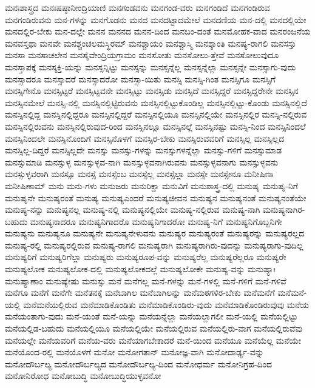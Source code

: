 {ಮನಃಶಾಸ್ತ್ರದ
ಮನಃಷಷ್ಠಾನೀಂದ್ರಿಯಾಣಿ
ಮನಗಂಡವನು
ಮನಗಂಡ-ವರು
ಮನಗಂಡಿದೆ
ಮನಗಂಡಿರುವ
ಮನಗಂಡಿರುವನು
ಮನ-ಗಳನ್ನು
ಮನಗೊಡನು
ಮನದ
ಮನದಟ್ಟಾದಮೇಲೆ
ಮನದಣಿಯ
ಮನ-ದಲ್ಲಿ
ಮನದಲ್ಲಿಯೇ
ಮನದಲ್ಲಿರ-ಬೇಕು
ಮನ-ದಲ್ಲೇ
ಮನನ
ಮನನದ
ಮನನ-ದಿಂದ
ಮನಬಂ-ದಂತೆ
ಮನಮೋಹಕ-ವಾದ
ಮನರಂಜನೆಯ
ಮನವಸ್ತಥಾ
ಮನವೇ
ಮನಶ್ಚಂಚಲಮಸ್ಥಿರಮ್
ಮನಶ್ಚಾಯಂ
ಮನಶ್ಚಾಸ್ಮಿ
ಮನಶ್ಶಾಂತಿ
ಮನಷ್ಯ-ರಾಗಲಿ
ಮನಸಸ್ತು
ಮನಸಾ
ಮನಸಾಚಲೇನ
ಮನಸೈವೇಂದ್ರಿಯಗ್ರಾಮಂ
ಮನಸೋತು
ಮನಸೋಲು-ತ್ತೇವೆ
ಮನಸೋಲುವುದೂ
ಮನಸ್ತಾಪಕ್ಕೆ
ಮನಸ್ಶಕ್ತಿ-ಯನ್ನು
ಮನಸ್ಸನ್ನಿಟ್ಟು
ಮನಸ್ಸನ್ನು
ಮನಸ್ಸನ್ನೆಲ್ಲ
ಮನಸ್ಸನ್ನೆಲ್ಲಾ
ಮನಸ್ಸನ್ನೇ
ಮನಸ್ಸಾಗು-ವುದು
ಮನಸ್ಸಾದರೂ
ಮನಸ್ಸಾದರೆ
ಮನಸ್ಸಾದರೋ
ಮನಸ್ಸಾ-ಯಿತು
ಮನಸ್ಸಿ
ಮನಸ್ಸಿ-ಗಿಂತ
ಮನಸ್ಸಿಗೂ
ಮನಸ್ಸಿಗೆ
ಮನಸ್ಸಿಗೇನೊ
ಮನಸ್ಸಿಟ್ಟರೆ
ಮನಸ್ಸಿಟ್ಟವನೇ
ಮನಸ್ಸಿಟ್ಟು
ಮನಸ್ಸಿಡು
ಮನಸ್ಸಿದೆ
ಮನಸ್ಸಿದ್ದರೆ
ಮನಸ್ಸಿದ್ದರೇನೇ
ಮನಸ್ಸಿನ
ಮನಸ್ಸಿನಮೇಲೆ
ಮನಸ್ಸಿ-ನಲ್ಲಿ
ಮನಸ್ಸಿನಲ್ಲಿಟ್ಟಿರುವನು
ಮನಸ್ಸಿನಲ್ಲಿಟ್ಟುಕೊಂಡಿಲ್ಲ
ಮನಸ್ಸಿನಲ್ಲಿಟ್ಟು-ಕೊಂಡು
ಮನಸ್ಸಿನಲ್ಲಿದೆ
ಮನಸ್ಸಿನಲ್ಲಿದ್ದ
ಮನಸ್ಸಿನಲ್ಲಿದ್ದರೂ
ಮನಸ್ಸಿನಲ್ಲಿದ್ದರೆ
ಮನಸ್ಸಿನಲ್ಲಿಯೂ
ಮನಸ್ಸಿನಲ್ಲಿಯೇ
ಮನಸ್ಸಿನಲ್ಲಿರ
ಮನಸ್ಸಿ-ನಲ್ಲಿರುವ
ಮನಸ್ಸಿನಲ್ಲಿರುವನು
ಮನಸ್ಸಿನಲ್ಲಿರುವುದ-ರಿಂದ
ಮನಸ್ಸಿನಲ್ಲೂ
ಮನಸ್ಸಿನಲ್ಲೆ
ಮನಸ್ಸಿನಷ್ಟು
ಮನಸ್ಸಿ-ನಿಂದ
ಮನಸ್ಸಿನಿಂದಲೆ
ಮನಸ್ಸಿನಿಂದಲೇ
ಮನಸ್ಸಿನೊಂದಿಗೆ
ಮನಸ್ಸಿನೊಳಗೆ
ಮನಸ್ಸಿರ-ಬೇಕು
ಮನಸ್ಸಿರುವವರಿಗೆ
ಮನಸ್ಸಿಲ್ಲ
ಮನಸ್ಸಿಲ್ಲದ
ಮನಸ್ಸಿಲ್ಲ-ದಿದ್ದರೆ
ಮನಸ್ಸಿಲ್ಲದೇ
ಮನಸ್ಸು
ಮನಸ್ಸು-ಗಳನ್ನು
ಮನಸ್ಸುಗಳನ್ನೆಲ್ಲಾ
ಮನಸ್ಸು-ಗಳಿಗೆ
ಮನಸ್ಸುಮಾಡ
ಮನಸ್ಸುಮಾಡಿ
ಮನಸ್ಸುಳ್ಳ
ಮನಸ್ಸುಳ್ಳವ-ನಾಗಿ
ಮನಸ್ಸುಳ್ಳವನಾಗಿರುವನು
ಮನಸ್ಸುಳ್ಳವನಾಗು
ಮನಸ್ಸುಳ್ಳವನು
ಮನಸ್ಸುಳ್ಳವರಾಗಿ
ಮನಸ್ಸೂ
ಮನಸ್ಸೆ
ಮನಸ್ಸೆಂಬ
ಮನಸ್ಸೆಲ್ಲ
ಮನಸ್ಸೆಲ್ಲಾ
ಮನಸ್ಸೇ
ಮನಸ್ಸೇನೂ
ಮನೀಷಿಣಃ
ಮನೀಷಿಣಾಮ್
ಮನು
ಮನು-ಗಳು
ಮನುಜರು
ಮನುರಿಕ್ಷಾ
ಮನುವಿಗೆ
ಮನುಶಾಸ್ತ್ರ-ದಲ್ಲಿ
ಮನುಷೃ
ಮನುಷೃ-ನಿಗೆ
ಮನುಷೃನೇ
ಮನುಷೃರಂತೆ
ಮನುಷ್ಯ
ಮನುಷ್ಯಎಂದರೆ
ಮನುಷ್ಯಜೀವನ
ಮನುಷ್ಯನ
ಮನುಷ್ಯನಂತೆ
ಮನುಷ್ಯನಂತೆಯೇ
ಮನುಷ್ಯ-ನನ್ನು
ಮನುಷ್ಯನಲ್ಲ
ಮನುಷ್ಯ-ನಲ್ಲಿ
ಮನುಷ್ಯನಲ್ಲಿಯೇ
ಮನುಷ್ಯ-ನಲ್ಲಿರುವ
ಮನುಷ್ಯ-ನಾಗಿ
ಮನುಷ್ಯನಾಗಿರ-ಬಹುದು
ಮನುಷ್ಯನಾದರೂ
ಮನುಷ್ಯನಿಗಾದರೊ
ಮನುಷ್ಯನಿಗಾದರೋ
ಮನುಷ್ಯ-ನಿಗೆ
ಮನುಷ್ಯನಿಗೊಬ್ಬನಿಗೇ
ಮನುಷ್ಯನು
ಮನುಷ್ಯನೂ
ಮನುಷ್ಯನೇ
ಮನುಷ್ಯನೇಳುವನು
ಮನುಷ್ಯರ
ಮನುಷ್ಯರಂತೆ
ಮನುಷ್ಯರನ್ನು
ಮನುಷ್ಯರಲ್ಲದ
ಮನುಷ್ಯ-ರಲ್ಲಿ
ಮನುಷ್ಯರಲ್ಲಿರುವ
ಮನುಷ್ಯ-ರಾಗಲಿ
ಮನುಷ್ಯರಾಗಿ
ಮನುಷ್ಯರಾಗಿರು-ವುದನ್ನು
ಮನುಷ್ಯರಾಗು-ವುದಿಲ್ಲ
ಮನುಷ್ಯರಿಗೆ
ಮನುಷ್ಯರಿಗೆಲ್ಲಾ
ಮನುಷ್ಯರು
ಮನುಷ್ಯರೂಪ-ವನ್ನು
ಮನುಷ್ಯರೆಲ್ಲ
ಮನುಷ್ಯರೆಲ್ಲರೂ
ಮನುಷ್ಯರೇ
ಮನುಷ್ಯಲೋಕ
ಮನುಷ್ಯಲೋಕ-ದಲ್ಲಿ
ಮನುಷ್ಯಲೋಕದಲ್ಲೆ
ಮನುಷ್ಯಲೋಕೇ
ಮನುಷ್ಯ-ವನ್ನು
ಮನುಷ್ಯಾಃ
ಮನುಷ್ಯಾಣಾಂ
ಮನುಷ್ಯೇಷು
ಮನುಸ್ಸು
ಮನೆ
ಮನೆಗಲ್ಲ
ಮನೆ-ಗಳನ್ನು
ಮನೆ-ಗಳಲ್ಲಿ
ಮನೆ-ಗಳಿಗೆ
ಮನೆ-ಗಳಿವೆ
ಮನೆಗೂ
ಮನೆಗೆ
ಮನೆಗೇ
ಮನೆತನಕ್ಕೆ
ಮನೆಬಾಗಿಲ
ಮನೆಬಾಗಿಲನ್ನು
ಮನೆಮಠಗಳಿರ-ಬೇಕು
ಮನೆಮನೆಗೆ
ಮನೆಮನೆ-ಯಲ್ಲಿ
ಮನೆಮನೆಯಲ್ಲಿರುವ
ಮನೆಮಾಡಿಕೊಂಡಿತು
ಮನೆಮಾಡಿಕೊಂಡಿರು-ವುದು
ಮನೆಮಾಡಿಕೊಂಡಿರುವುವು
ಮನೆಯ
ಮನೆಯಂತಾಗು-ವುದು
ಮನೆ-ಯಂತೆ
ಮನೆ-ಯನ್ನು
ಮನೆಯನ್ನೆಲ್ಲಾ
ಮನೆಯಲ್ಲಾಗಲೀ
ಮನೆ-ಯಲ್ಲಿ
ಮನೆಯಲ್ಲಿಟ್ಟು
ಮನೆಯಲ್ಲಿಡ-ಬಹುದು
ಮನೆಯಲ್ಲಿಯೂ
ಮನೆಯಲ್ಲಿಯೇ
ಮನೆಯಲ್ಲಿರುವ
ಮನೆಯಲ್ಲಿರು-ವಾಗ
ಮನೆಯಲ್ಲಿರುವೆವು
ಮನೆಯಲ್ಲೇ
ಮನೆಯವರಿಗೆ
ಮನೆಯ-ವರು
ಮನೆಯಾಗಬೇಕಾದರೆ
ಮನೆ-ಯಿಂದ
ಮನೆಯೂ
ಮನೆಯೆಲ್ಲ
ಮನೆಯೇ
ಮನೆಯೊಂದ-ರಲ್ಲಿ
ಮನೆಯೊಳಗೆ
ಮನೋ
ಮನೋಗತಾನ್
ಮನೋಜ್ಞ-ವಾಗಿ
ಮನೋದಾರ್ಢ್ಯ-ವನ್ನು
ಮನೋದೌರ್ಬಲ್ಯ
ಮನೋದೌರ್ಬಲ್ಯದ
ಮನೋದೌರ್ಬಲ್ಯ-ದಿಂದ
ಮನೋಧರ್ಮ
ಮನೋನಿಗ್ರಹ-ದಿಂದ
ಮನೋನಿರೋಧ
ಮನೋಬುದ್ಧಿ
ಮನೋಬುದ್ಧಿಯುಳ್ಳವನೋ
}
